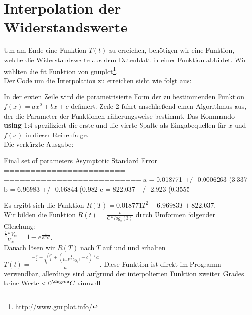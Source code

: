 \documentclass[12pt,titlepage]{article}
\begin{document}
	\section{Interpolation der Widerstandswerte}
		Um am Ende eine Funktion $T(t)$ zu erreichen, benötigen wir eine Funktion, welche die Widerstandswerte aus dem Datenblatt in einer Funktion abbildet. Wir wählten die fit Funktion von gnuplot\footnote{http://www.gnuplot.info/}.\\
		Der Code um die Interpolation zu erreichen sieht wie folgt aus:
		
		In der ersten Zeile wird die parametrisierte Form der zu bestimmenden Funktion\\
		$f(x)=ax^2+bx+c$ definiert.
		Zeile 2 führt anschließend einen Algorithmus aus, der die Parameter der Funktionen näherungsweise bestimmt.
		Das Kommando \textbf{using} 1:4 spezifiziert die erste und die vierte Spalte als Eingabequellen für $x$ und $f(x)$ in dieser Reihenfolge.\\
		Die verkürzte Ausgabe:
		\begin{listing}

Final set of parameters       Asymptotic Standard Error
=======================       ==========================
a          = 0.018771         +/- 0.0006263    (3.337%
b          = 6.96983          +/- 0.06844      (0.982%
c          = 822.037          +/- 2.923        (0.3555%
		\end{listing}
		Es ergibt sich die Funktion $R(T)=0.018771T^2+6.96983T+ 822.037$.
		\hfill \\
		Wir bilden die Funktion $R(t)=\frac{t}{C*log_e(3)}$ durch Umformen folgender Gleichung:\\
		$\frac{\frac{2}{3}*V_{cc}}{V_{cc}} = 1-e^{\frac{t}{R*C}}$.\\
		Danach lösen wir $R(T)$ nach $T$ auf und und erhalten $T(t)=\frac{-\frac{b}{2}\pm\sqrt{\frac{b^2}{4}+(\frac{1}{1mF*log_e{3}}-c)*a}}{a}$.
		Diese Funktion ist direkt im Programm verwendbar, allerdings sind aufgrund der interpolierten Funktion zweiten Grades keine Werte $<0^{\degree}C$ sinnvoll.
		
\end{document}
